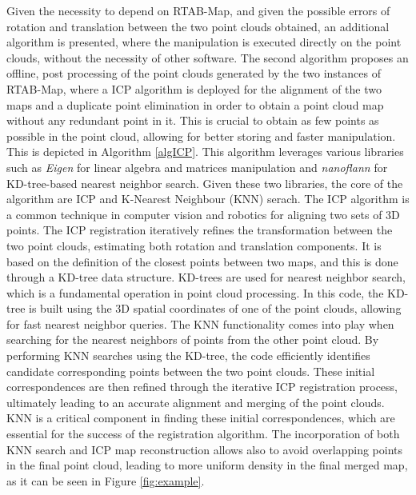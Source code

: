 Given the necessity to depend on RTAB-Map, and given the possible errors of rotation and translation between the two point clouds obtained, an additional algorithm is presented, where the manipulation is executed directly on the point clouds, without the necessity of other software. The second algorithm proposes an offline, post processing of the point clouds generated by the two instances of RTAB-Map, where a ICP algorithm is deployed for the alignment of the two maps and a duplicate point elimination in order to obtain a point cloud map without any redundant point in it. This is crucial to obtain as few points as possible in the point cloud, allowing for better storing and faster manipulation. This is depicted in  Algorithm \ref{algICP}. This algorithm leverages various libraries such as \textit{Eigen} \cite{guennebaud2010eigen} for linear algebra and matrices manipulation and \textit{nanoflann} \cite{blanco2017nanoflann} for KD-tree-based nearest neighbor search. Given these two libraries, the core of the algorithm are ICP and K-Nearest Neighbour (KNN) serach. The ICP algorithm is a common technique in computer vision and robotics for aligning two sets of 3D points. The ICP registration iteratively refines the transformation between the two point clouds, estimating both rotation and translation components. It is based on the definition of the closest points between two maps, and this is done through a KD-tree data structure. KD-trees are used for nearest neighbor search, which is a fundamental operation in point cloud processing. In this code, the KD-tree is built using the 3D spatial coordinates of one of the point clouds, allowing for fast nearest neighbor queries. The KNN functionality comes into play when searching for the nearest neighbors of points from the other point cloud. By performing KNN searches using the KD-tree, the code efficiently identifies candidate corresponding points between the two point clouds. These initial correspondences are then refined through the iterative ICP registration process, ultimately leading to an accurate alignment and merging of the point clouds. KNN is a critical component in finding these initial correspondences, which are essential for the success of the registration algorithm. The incorporation of both KNN search and ICP map reconstruction allows also to avoid overlapping points in the final point cloud, leading to more uniform density in the final merged map, as it can be seen in Figure \ref{fig:example}.

